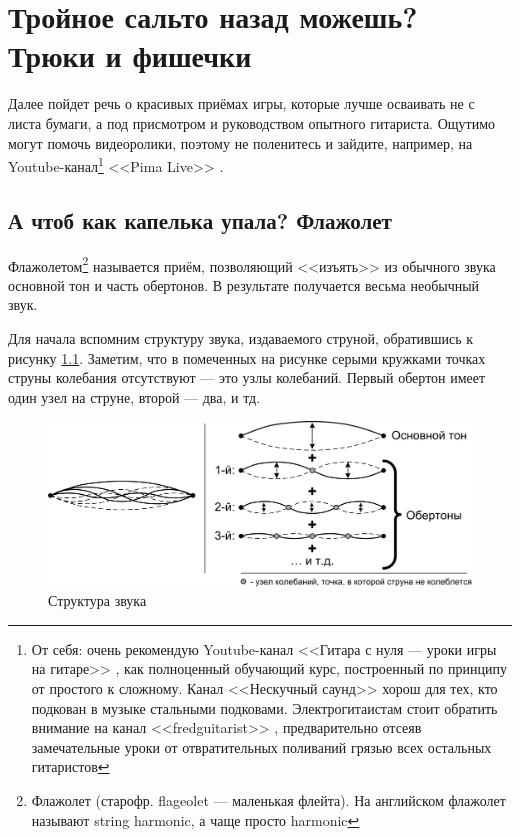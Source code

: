 \chapter{Тройное сальто назад можешь? Трюки и фишечки}
\label{ch:tricks}

Далее пойдет речь о красивых приёмах игры, которые лучше осваивать не с листа бумаги, а под присмотром и руководством опытного гитариста. Ощутимо могут помочь видеоролики, поэтому не поленитесь и зайдите, например, на Youtube-канал\footnote{От себя: очень рекомендую Youtube-канал <<Гитара с нуля --- уроки игры на гитаре>> \cite{url:guitarFromZero}, как полноценный обучающий курс, построенный по принципу от простого к сложному. Канал <<Нескучный саунд>> \cite{url:funnySound} хорош для тех, кто подкован в музыке стальными подковами. Электрогитаистам стоит обратить внимание на канал <<fredguitarist>> \cite{url:fredguitarist}, предварительно отсеяв замечательные уроки от отвратительных поливаний грязью всех остальных гитаристов} <<Pima Live>> \cite{url:pimalive}.


\section{А чтоб как капелька упала? Флажолет}
\label{ch:tricks:flageolet}

Флажолетом\footnote{Флажолет (старофр. flageolet --- маленькая флейта). На английском флажолет называют string harmonic, а чаще просто harmonic} называется приём, позволяющий <<изъять>> из обычного звука основной тон и часть обертонов. В результате получается весьма необычный звук.

Для начала вспомним структуру звука, издаваемого струной, обратившись к рисунку \ref{fig:tricks:flageolet:nodes}. Заметим, что в помеченных на рисунке серыми кружками точках струны колебания отсутствуют --- это узлы колебаний. Первый обертон имеет один узел на струне, второй --- два, и тд.

\begin{figure}[!ht]
    \centering
    \includegraphics{fig/string-nodes} 
    \caption{Структура звука}\label{fig:tricks:flageolet:nodes}
\end{figure}

